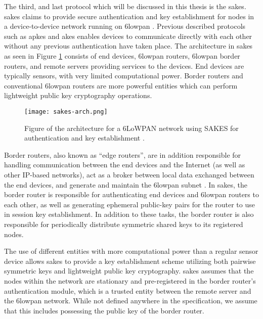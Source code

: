 The third, and last protocol which will be discussed in this thesis is the \gls{sakes}. \gls{sakes} claims to provide secure authentication and key establishment for nodes in a device-to-device network running on \gls{6lowpan} \cite{hussen2013sakes}. Previous described protocols such as \gls{apkes} and \gls{akes} enables devices to communicate directly with each other without any previous authentication have taken place. The architecture in \gls{sakes} as seen in Figure \ref{fig:sakes-arch} consists of end devices, \gls{6lowpan} routers, \gls{6lowpan} border routers, and remote servers providing services to the devices. End devices are typically sensors, with very limited computational power. Border routers and conventional \gls{6lowpan} routers are more powerful entities which can perform lightweight public key cryptography operations.


\begin{figure}[h]
	\centering
	\texttt{[image: sakes-arch.png]}
	\caption{Figure of the architecture for a 6LoWPAN network using SAKES for authentication and key establishment \cite{hussen2013sakes}.}
	\label{fig:sakes-arch}
\end{figure}


Border routers, also known as ``edge routers'', are in addition responsible for handling communication between the end devices and the Internet (as well as other IP-based networks), act as a broker between local data exchanged between the end devices, and generate and maintain the \gls{6lowpan} subnet \cite{olsson20146lowpan}. In \gls{sakes}, the border router is responsible for authenticating end devices and \gls{6lowpan} routers to each other, as well as generating ephemeral public-key pairs for the router to use in session key establishment. In addition to these tasks, the border router is also responsible for periodically distribute symmetric shared keys to its registered nodes.

The use of different entities with more computational power than a regular sensor device allows \gls{sakes} to provide a key establishment scheme utilizing both pairwise symmetric keys and lightweight public key cryptography. \gls{sakes} assumes that the nodes within the network are stationary and pre-registered in the border router's authentication module, which is a trusted entity between the remote server and the \gls{6lowpan} network. While not defined anywhere in the specification, we assume that this includes possessing the public key of the border router. 

